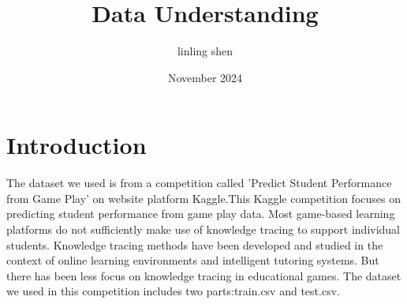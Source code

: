 \documentclass{article}
\title{Data Understanding}
\author{linling shen}
\date{November 2024}
\begin{document}
\maketitle

\section{Introduction}
    The dataset we used is from a competition called 'Predict Student Performance from Game Play' on website platform Kaggle.This Kaggle competition focuses on predicting student performance from game play data. Most game-based learning platforms do not sufficiently make use of knowledge tracing to support individual students. Knowledge tracing methods have been developed and studied in the context of online learning environments and intelligent tutoring systems. But there has been less focus on knowledge tracing in educational games. 
The dataset we used in this competition includes two parts:train.csv and test.csv.
\end{document}
